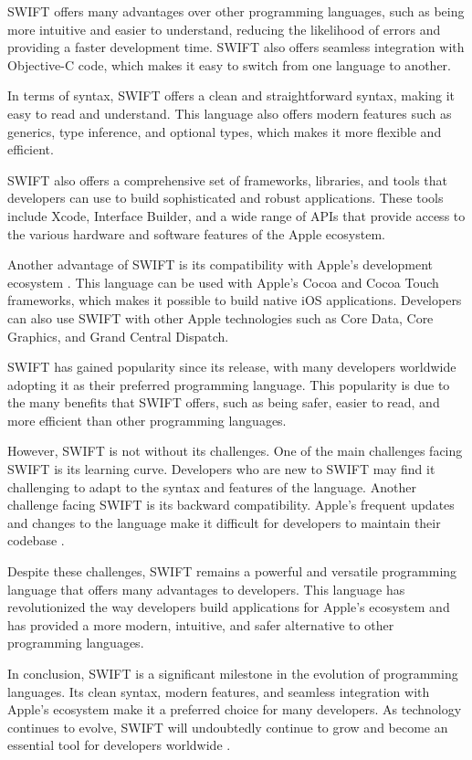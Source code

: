 \documentclass[11pt]{Abdullahmad} %
\begin{document}
SWIFT offers many advantages over other programming languages, such as being more intuitive and easier to understand, reducing the likelihood of errors and providing a faster development time. SWIFT also offers seamless integration with Objective-C code, which makes it easy to switch from one language to another.

In terms of syntax, SWIFT offers a clean and straightforward syntax, making it easy to read and understand. This language also offers modern features such as generics, type inference, and optional types, which makes it more flexible and efficient. \cite{10.1145/3383219.3383237}

SWIFT also offers a comprehensive set of frameworks, libraries, and tools that developers can use to build sophisticated and robust applications. These tools include Xcode, Interface Builder, and a wide range of APIs that provide access to the various hardware and software features of the Apple ecosystem.

Another advantage of SWIFT is its compatibility with Apple's development ecosystem \cite{fojtik2020swift}. This language can be used with Apple's Cocoa and Cocoa Touch frameworks, which makes it possible to build native iOS applications. Developers can also use SWIFT with other Apple technologies such as Core Data, Core Graphics, and Grand Central Dispatch.

SWIFT has gained popularity since its release, with many developers worldwide adopting it as their preferred programming language. This popularity is due to the many benefits that SWIFT offers, such as being safer, easier to read, and more efficient than other programming languages.

However, SWIFT is not without its challenges. One of the main challenges facing SWIFT is its learning curve. Developers who are new to SWIFT may find it challenging to adapt to the syntax and features of the language. Another challenge facing SWIFT is its backward compatibility. Apple's frequent updates and changes to the language make it difficult for developers to maintain their codebase \cite{el2018methodology}.

Despite these challenges, SWIFT remains a powerful and versatile programming language that offers many advantages to developers. This language has revolutionized the way developers build applications for Apple's ecosystem and has provided a more modern, intuitive, and safer alternative to other programming languages\cite{el2018methodology}.

In conclusion, SWIFT is a significant milestone in the evolution of programming languages. Its clean syntax, modern features, and seamless integration with Apple's ecosystem make it a preferred choice for many developers. As technology continues to evolve, SWIFT will undoubtedly continue to grow and become an essential tool for developers worldwide \cite{latif2016cross}.
\end{document}

